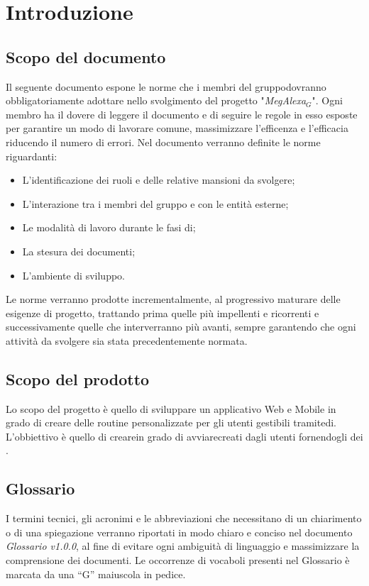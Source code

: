 \chapter{Introduzione}
\section{Scopo del documento}
Il seguente documento espone le norme che i membri del gruppodovranno obbligatoriamente adottare nello svolgimento del progetto "\textit{MegAlexa$_{G}$}".
Ogni membro ha il dovere di leggere il documento e di seguire le regole in esso esposte per garantire  un modo di lavorare comune, massimizzare l'efficenza e l'efficacia riducendo il numero di errori.
Nel documento verranno definite le  norme riguardanti:
\begin{itemize}
		\item L'identificazione dei ruoli e delle relative mansioni da svolgere;
		\item L'interazione tra i membri del gruppo e con le entità esterne;
		\item Le modalità di lavoro durante le fasi di;
		\item La stesura dei documenti;
		\item L'ambiente di sviluppo.
\end{itemize}
Le norme verranno prodotte incrementalmente, al progressivo maturare delle esigenze di progetto, trattando prima quelle più impellenti e ricorrenti e successivamente quelle che interverranno più avanti, sempre garantendo che ogni attività da svolgere sia stata precedentemente normata.

\section{Scopo del prodotto}
Lo scopo del progetto è quello di sviluppare un applicativo Web e Mobile in grado di creare delle routine personalizzate per gli utenti gestibili tramitedi. L'obbiettivo è quello di crearein grado di avviarecreati dagli utenti fornendogli dei .

\section{Glossario}
I termini tecnici, gli acronimi e le abbreviazioni che necessitano di un chiarimento
o di una spiegazione verranno riportati in modo chiaro e conciso nel
documento \textit{Glossario v1.0.0}, al fine di evitare ogni ambiguità di linguaggio
e massimizzare la comprensione dei documenti. Le occorrenze di vocaboli presenti nel Glossario è marcata da una “G” maiuscola in pedice.

